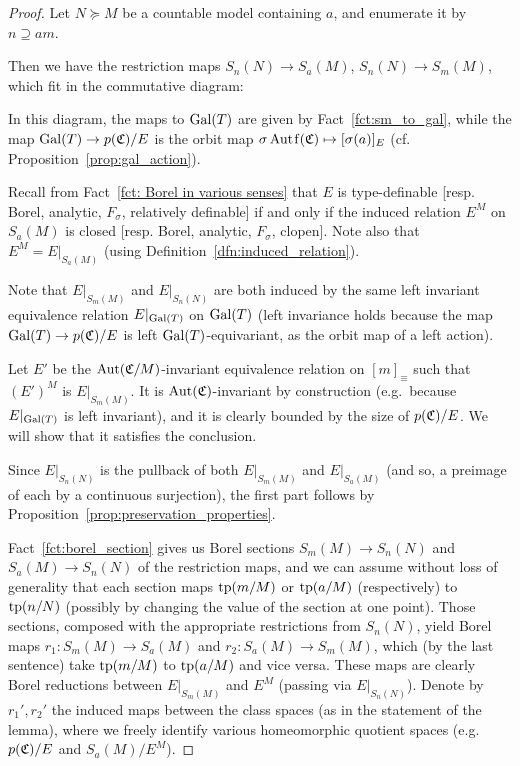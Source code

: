 	\begin{proof}
		Let $N\succeq M$ be a countable model containing $a$, and enumerate it by $n\supseteq am$.
		
		Then we have the restriction maps $S_n(N)\to S_a(M)$, $S_n(N)\to S_m(M)$, which fit in the commutative diagram:
		\begin{center}
		\end{center}
		In this diagram, the maps to $\operatorname{{Gal}}(T)$ are given by Fact~\ref{fct:sm_to_gal}, while the map $\operatorname{{Gal}}(T)\to p({\mathfrak C})/E$ is the orbit map $\sigma\Autf(\fC)\mapsto [\sigma(a)]_E$ (cf. Proposition~\ref{prop:gal_action}).
		
		Recall from Fact~\ref{fct: Borel in various senses} that $E$ is type-definable [resp. Borel, analytic, $F_\sigma$, relatively definable] if and only if the induced relation $E^M$ on $S_a(M)$ is closed [resp. Borel, analytic, $F_\sigma$, clopen]. Note also that $E^M=E|_{S_{a}(M)}$ (using Definition~\ref{dfn:induced_relation}).
		
		Note that $E|_{S_m(M)}$ and $E|_{S_n(N)}$ are both induced by the same left invariant equivalence relation $E|_{\operatorname{{Gal}}(T)}$ on $\operatorname{{Gal}}(T)$ (left invariance holds because the map $\operatorname{{Gal}}(T)\to p({\mathfrak C})/E$ is left $\operatorname{{Gal}}(T)$-equivariant, as the orbit map of a left action).
		
		
		Let $E'$ be the $\operatorname{{Aut}}({\mathfrak C}/M)$-invariant equivalence relation on $[m]_{\equiv}$ such that $(E')^M$ is $E|_{S_m(M)}$. It is $\operatorname{{Aut}}({\mathfrak C})$-invariant by construction (e.g.\ because $E|_{\operatorname{{Gal}}(T)}$ is left invariant), and it is clearly bounded by the size of $p({\mathfrak C})/E$. We will show that it satisfies the conclusion.
		
		Since $E|_{S_n(N)}$ is the pullback of both $E|_{S_m(M)}$ and $E|_{S_a(M)}$ (and so, a preimage of each by a continuous surjection), the first part follows by Proposition~\ref{prop:preservation_properties}.
		
		Fact~\ref{fct:borel_section} gives us Borel sections $S_m(M)\to S_n(N)$ and $S_a(M)\to S_n(N)$ of the restriction maps, and we can assume without loss of generality that each section maps $\operatorname{{tp}}(m/M)$ or $\operatorname{{tp}}(a/M)$ (respectively) to $\operatorname{{tp}}(n/N)$ (possibly by changing the value of the section at one point). Those sections, composed with the appropriate restrictions from $S_n(N)$, yield Borel maps $r_1\colon S_m(M)\to S_a(M)$ and $r_2\colon S_a(M)\to S_m(M)$, which (by the last sentence) take $\operatorname{{tp}}(m/M)$ to $\operatorname{{tp}}(a/M)$ and vice versa. These maps are clearly Borel reductions between $E|_{S_m(M)}$ and $E^M$ (passing via $E|_{S_n(N)}$). Denote by $r_1',r_2'$ the induced maps between the class spaces (as in the statement of the lemma), where we freely identify various homeomorphic quotient spaces (e.g.\ $p({\mathfrak C})/E$ and $S_a(M)/E^M$).
		

\end{proof}
